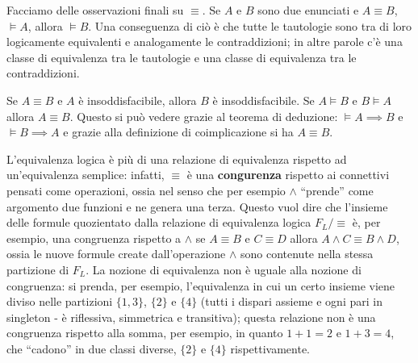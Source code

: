 Facciamo delle osservazioni finali su $\equiv$. 
Se $A$ e $B$ sono due enunciati e $A \equiv B$, $\models A$,
allora $\models B$. Una conseguenza di ciò è che 
tutte le tautologie sono tra di loro logicamente 
equivalenti e analogamente le contraddizioni; in 
altre parole c'è una classe di equivalenza tra 
le tautologie e una classe di equivalenza tra le 
contraddizioni. 

Se $A \equiv B$ e $A$ è insoddisfacibile, allora $B$ 
è insoddisfacibile. 
Se $A \models B$ e $B \models A$ allora $A \equiv B$. Questo 
si può vedere grazie al teorema di deduzione: 
$ \models A \implies B$ e $ \models B \implies A$ e 
grazie alla definizione di coimplicazione 
si ha $A \equiv B$. 


L'equivalenza logica è più di una relazione di equivalenza
rispetto ad un'equivalenza semplice: infatti, $\equiv$ è 
una \textbf{congurenza} rispetto ai connettivi pensati 
come operazioni, ossia nel senso che per esempio $\land$ 
``prende'' come argomento due funzioni e ne genera una terza. 
Questo vuol dire che l'insieme delle formule quozientato 
dalla relazione di equivalenza logica $F_L/\equiv$ è, 
per esempio, una congruenza rispetto a $\land$ se 
$A \equiv B$ e $C \equiv D$ allora $A \land C \equiv B \land D$, 
ossia le nuove formule create dall'operazione $\land$ sono 
contenute nella stessa partizione di $F_L$. La nozione 
di equivalenza non è uguale alla nozione di congruenza: 
si prenda, per esempio, l'equivalenza in cui un certo 
insieme viene diviso nelle partizioni $\{1,3\}$, 
$\{2\}$ e $\{4\}$ (tutti i dispari assieme e ogni 
pari in singleton - è riflessiva, simmetrica e transitiva); 
questa relazione non è una congruenza rispetto alla somma, 
per esempio, in quanto $1 + 1 = 2$ e $ 1 + 3 = 4$, che 
``cadono'' in due classi diverse, $\{2\}$ e $\{4\}$ 
rispettivamente. 


